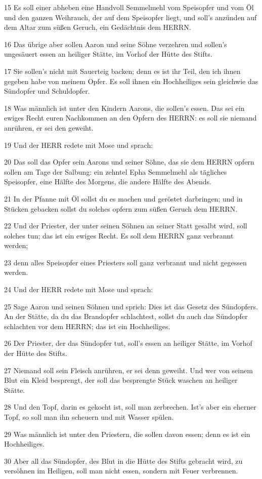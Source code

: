 \par 15 Es soll einer abheben eine Handvoll Semmelmehl vom Speisopfer und vom Öl und den ganzen Weihrauch, der auf dem Speisopfer liegt, und soll's anzünden auf dem Altar zum süßen Geruch, ein Gedächtnis dem HERRN.
\par 16 Das übrige aber sollen Aaron und seine Söhne verzehren und sollen's ungesäuert essen an heiliger Stätte, im Vorhof der Hütte des Stifts.
\par 17 Sie sollen's nicht mit Sauerteig backen; denn es ist ihr Teil, den ich ihnen gegeben habe von meinem Opfer. Es soll ihnen ein Hochheiliges sein gleichwie das Sündopfer und Schuldopfer.
\par 18 Was männlich ist unter den Kindern Aarons, die sollen's essen. Das sei ein ewiges Recht euren Nachkommen an den Opfern des HERRN: es soll sie niemand anrühren, er sei den geweiht.
\par 19 Und der HERR redete mit Mose und sprach:
\par 20 Das soll das Opfer sein Aarons und seiner Söhne, das sie dem HERRN opfern sollen am Tage der Salbung: ein zehntel Epha Semmelmehl als tägliches Speisopfer, eine Hälfte des Morgens, die andere Hälfte des Abends.
\par 21 In der Pfanne mit Öl sollst du es machen und geröstet darbringen; und in Stücken gebacken sollst du solches opfern zum süßen Geruch dem HERRN.
\par 22 Und der Priester, der unter seinen Söhnen an seiner Statt gesalbt wird, soll solches tun; das ist ein ewiges Recht. Es soll dem HERRN ganz verbrannt werden;
\par 23 denn alles Speisopfer eines Priesters soll ganz verbrannt und nicht gegessen werden.
\par 24 Und der HERR redete mit Mose und sprach:
\par 25 Sage Aaron und seinen Söhnen und sprich: Dies ist das Gesetz des Sündopfers. An der Stätte, da du das Brandopfer schlachtest, sollst du auch das Sündopfer schlachten vor dem HERRN; das ist ein Hochheiliges.
\par 26 Der Priester, der das Sündopfer tut, soll's essen an heiliger Stätte, im Vorhof der Hütte des Stifts.
\par 27 Niemand soll sein Fleisch anrühren, er sei denn geweiht. Und wer von seinem Blut ein Kleid besprengt, der soll das besprengte Stück waschen an heiliger Stätte.
\par 28 Und den Topf, darin es gekocht ist, soll man zerbrechen. Ist's aber ein eherner Topf, so soll man ihn scheuern und mit Wasser spülen.
\par 29 Was männlich ist unter den Priestern, die sollen davon essen; denn es ist ein Hochheiliges.
\par 30 Aber all das Sündopfer, des Blut in die Hütte des Stifts gebracht wird, zu versöhnen im Heiligen, soll man nicht essen, sondern mit Feuer verbrennen.

